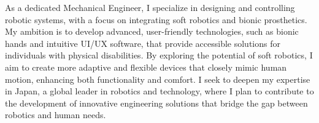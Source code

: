 \documentclass[10pt, letterpaper]{article}
\begin{document}
        \begin{changemargin}{0.2 cm}{0.2 cm}
        As a dedicated Mechanical Engineer, I specialize in designing and controlling robotic systems, with a focus on integrating soft robotics and bionic prosthetics. My ambition is to develop advanced, user-friendly technologies, such as bionic hands and intuitive UI/UX software, that provide accessible solutions for individuals with physical disabilities. By exploring the potential of soft robotics, I aim to create more adaptive and flexible devices that closely mimic human motion, enhancing both functionality and comfort. I seek to deepen my expertise in Japan, a global leader in robotics and technology, where I plan to contribute to the development of innovative engineering solutions that bridge the gap between robotics and human needs.
        \end{changemargin}
    \vspace{-0.3cm}
\end{document}
